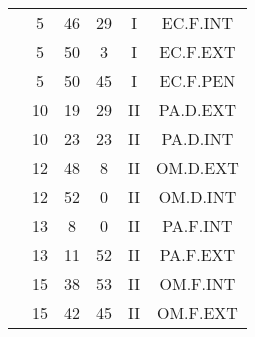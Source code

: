 \documentclass[12pt, a4paper]{article}
\begin{document}
\begin{multicols}{3}
{\begin{tabular}{c c c c c c}
	 	 	 	 & 5 & 46 & 29 & I & EC.F.INT\\%
	 	 	 	 & 5 & 50 & 3 & I & EC.F.EXT\\%
	 	 	 	 & 5 & 50 & 45 & I & EC.F.PEN\\%
	 	 	 	 & 10 & 19 & 29 & II & PA.D.EXT\\%
	 	 	 	 & 10 & 23 & 23 & II & PA.D.INT\\%
	 	 	 	 & 12 & 48 & 8 & II & OM.D.EXT\\%
	 	 	 	 & 12 & 52 & 0 & II & OM.D.INT\\%
	 	 	 	 & 13 & 8 & 0 & II & PA.F.INT\\%
	 	 	 	 & 13 & 11 & 52 & II & PA.F.EXT\\%
	 	 	 	 & 15 & 38 & 53 & II & OM.F.INT\\%
	 	 	 	 & 15 & 42 & 45 & II & OM.F.EXT\\%
	 	 \end{tabular}
 	}
\end{multicols}
\end{document}
